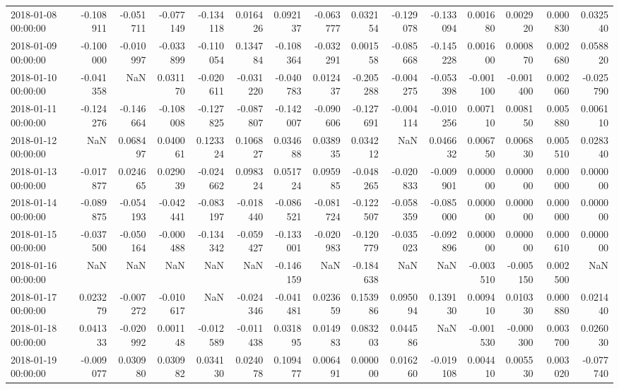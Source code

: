 \begin{tabular}{lrrrrrrrrrrrrrr}
2018-01-08 00:00:00 & -0.108911 & -0.051711 & -0.077149 & -0.134118 & 0.016426 & 0.092137 & -0.063777 & 0.032154 & -0.129078 & -0.133094 & 0.001680 & 0.002920 & 0.000830 & 0.032540 \\
2018-01-09 00:00:00 & -0.100000 & -0.010997 & -0.033899 & -0.110054 & 0.134784 & -0.108364 & -0.032291 & 0.001558 & -0.085668 & -0.145228 & 0.001600 & 0.000870 & 0.002680 & 0.058820 \\
2018-01-10 00:00:00 & -0.041358 & NaN & 0.031170 & -0.020611 & -0.031220 & -0.040783 & 0.012437 & -0.205288 & -0.004275 & -0.053398 & -0.001100 & -0.001400 & 0.002060 & -0.025790 \\
2018-01-11 00:00:00 & -0.124276 & -0.146664 & -0.108008 & -0.127825 & -0.087807 & -0.142007 & -0.090606 & -0.127691 & -0.004114 & -0.010256 & 0.007110 & 0.008150 & 0.005880 & 0.006110 \\
2018-01-12 00:00:00 & NaN & 0.068497 & 0.040061 & 0.123324 & 0.106827 & 0.034688 & 0.038935 & 0.034212 & NaN & 0.046632 & 0.006750 & 0.006830 & 0.005510 & 0.028340 \\
2018-01-13 00:00:00 & -0.017877 & 0.024665 & 0.029039 & -0.024662 & 0.098324 & 0.051724 & 0.095985 & -0.048265 & -0.020833 & -0.009901 & 0.000000 & 0.000000 & 0.000000 & 0.000000 \\
2018-01-14 00:00:00 & -0.089875 & -0.054193 & -0.042441 & -0.083197 & -0.018440 & -0.086521 & -0.081724 & -0.122507 & -0.058359 & -0.085000 & 0.000000 & 0.000000 & 0.000000 & 0.000000 \\
2018-01-15 00:00:00 & -0.037500 & -0.050164 & -0.000488 & -0.134342 & -0.059427 & -0.133001 & -0.020983 & -0.120779 & -0.035023 & -0.092896 & 0.000000 & 0.000000 & 0.000610 & 0.000000 \\
2018-01-16 00:00:00 & NaN & NaN & NaN & NaN & NaN & -0.146159 & NaN & -0.184638 & NaN & NaN & -0.003510 & -0.005150 & 0.002500 & NaN \\
2018-01-17 00:00:00 & 0.023279 & -0.007272 & -0.010617 & NaN & -0.024346 & -0.041481 & 0.023659 & 0.153986 & 0.095094 & 0.139130 & 0.009410 & 0.010330 & 0.000880 & 0.021440 \\
2018-01-18 00:00:00 & 0.041333 & -0.020992 & 0.001148 & -0.012589 & -0.011438 & 0.031895 & 0.014983 & 0.083203 & 0.044586 & NaN & -0.001530 & -0.000300 & 0.003700 & 0.026030 \\
2018-01-19 00:00:00 & -0.009077 & 0.030980 & 0.030982 & 0.034130 & 0.024078 & 0.109477 & 0.006491 & 0.000000 & 0.016260 & -0.019108 & 0.004410 & 0.005530 & 0.003020 & -0.077740 \\

\end{tabular}
